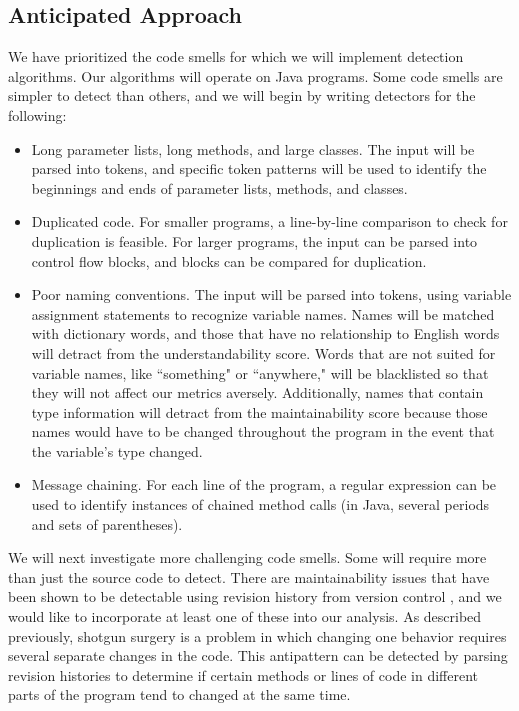 \documentclass{sig-alternate}
\begin{document}
\subsection{Anticipated Approach}
\label{subsec:approach}

We have prioritized the code smells for which we will implement detection algorithms. Our algorithms will operate on Java programs. Some code smells are simpler to detect than others, and we will begin by writing detectors for the following:
\begin{itemize}
\item Long parameter lists, long methods, and large classes. The input will be parsed into tokens, and specific token patterns will be used to identify the beginnings and ends of parameter lists, methods, and classes.
\item Duplicated code.  For smaller programs, a line-by-line comparison to check for duplication is feasible. For larger programs, the input can be parsed into control flow blocks, and blocks can be compared for duplication. 
\item Poor naming conventions. The input will be parsed into tokens, using variable assignment statements to recognize variable names. Names will be matched with dictionary words, and those that have no relationship to English words will detract from the understandability score. Words that are not suited for variable names, like ``something" or ``anywhere," will be blacklisted so that they will not affect our metrics aversely.  Additionally, names that contain type information will detract from the maintainability score because those names would have to be changed throughout the program in the event that the variable's type changed.
\item Message chaining. For each line of the program, a regular expression can be used to identify instances of chained method calls (in Java, several periods and sets of  parentheses). 
\end{itemize}
We will next investigate more challenging code smells. Some will require more than just the source code to detect. There are maintainability issues that have been shown to be detectable using revision history from version control \cite{palomba}, and we would like to incorporate at least one of these into our analysis.  As described previously, shotgun surgery is a problem in which changing one behavior requires several separate changes in the code.  This antipattern can be detected by parsing revision histories to determine if certain methods or lines of code in different parts of the program tend to changed at the same time.
\end{document}

